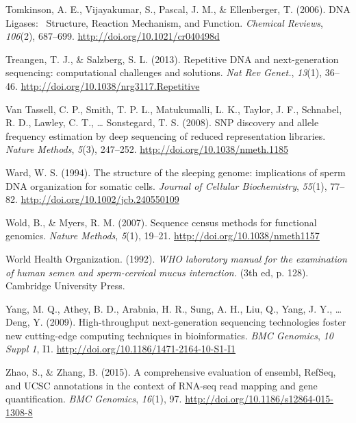 \documentclass[12pt,twoside]{reedthesis}
\theoremstyle{definition}
\theoremstyle{definition}
\theoremstyle{remark}
\begin{document}
  \hypertarget{ref-Tomkinson2006}{}
  Tomkinson, A. E., Vijayakumar, S., Pascal, J. M., \& Ellenberger, T.
  (2006). DNA Ligases:~ Structure, Reaction Mechanism, and Function.
  \emph{Chemical Reviews}, \emph{106}(2), 687--699.
  \url{http://doi.org/10.1021/cr040498d}
  
  \hypertarget{ref-Treangen2013}{}
  Treangen, T. J., \& Salzberg, S. L. (2013). Repetitive DNA and
  next-generation sequencing: computational challenges and solutions.
  \emph{Nat Rev Genet.}, \emph{13}(1), 36--46.
  \url{http://doi.org/10.1038/nrg3117.Repetitive}
  
  \hypertarget{ref-VanTassell2008}{}
  Van Tassell, C. P., Smith, T. P. L., Matukumalli, L. K., Taylor, J. F.,
  Schnabel, R. D., Lawley, C. T., \ldots{} Sonstegard, T. S. (2008). SNP
  discovery and allele frequency estimation by deep sequencing of reduced
  representation libraries. \emph{Nature Methods}, \emph{5}(3), 247--252.
  \url{http://doi.org/10.1038/nmeth.1185}
  
  \hypertarget{ref-Ward1994}{}
  Ward, W. S. (1994). The structure of the sleeping genome: implications
  of sperm DNA organization for somatic cells. \emph{Journal of Cellular
  Biochemistry}, \emph{55}(1), 77--82.
  \url{http://doi.org/10.1002/jcb.240550109}
  
  \hypertarget{ref-Wold2007}{}
  Wold, B., \& Myers, R. M. (2007). Sequence census methods for functional
  genomics. \emph{Nature Methods}, \emph{5}(1), 19--21.
  \url{http://doi.org/10.1038/nmeth1157}
  
  \hypertarget{ref-WorldHealthOrganization1992}{}
  World Health Organization. (1992). \emph{WHO laboratory manual for the
  examination of human semen and sperm-cervical mucus interaction.} (3th
  ed, p. 128). Cambridge University Press.
  
  \hypertarget{ref-Yang2009}{}
  Yang, M. Q., Athey, B. D., Arabnia, H. R., Sung, A. H., Liu, Q., Yang,
  J. Y., \ldots{} Deng, Y. (2009). High-throughput next-generation
  sequencing technologies foster new cutting-edge computing techniques in
  bioinformatics. \emph{BMC Genomics}, \emph{10 Suppl 1}, I1.
  \url{http://doi.org/10.1186/1471-2164-10-S1-I1}
  
  \hypertarget{ref-Zhao2015}{}
  Zhao, S., \& Zhang, B. (2015). A comprehensive evaluation of ensembl,
  RefSeq, and UCSC annotations in the context of RNA-seq read mapping and
  gene quantification. \emph{BMC Genomics}, \emph{16}(1), 97.
  \url{http://doi.org/10.1186/s12864-015-1308-8}


\end{document}

